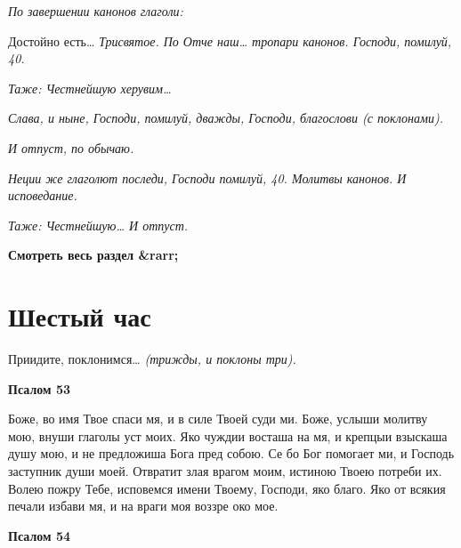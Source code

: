  \itshape По завершении канонов глаголи:\normalfont{}


   Достойно есть… \itshape Трисвятое\normalfont{}. \itshape По\normalfont{} Отче наш… \itshape тропари канонов.\normalfont{} Господи,
помилуй, \itshape 40\normalfont{}.


 \itshape Таже:\normalfont{} Честнейшую херувим…


 \itshape Слава, и ныне,\normalfont{} Господи, помилуй, \itshape дважды\normalfont{}, Господи, благослови \itshape (с
поклонами)\normalfont{}.


 \itshape И отпуст, по обычаю.\normalfont{}


 \itshape Неции же глаголют последи,\normalfont{} Господи помилуй, \itshape 40. Молитвы канонов. И
исповедание.\normalfont{}


 \itshape Таже:\normalfont{} Честнейшую… \itshape И отпуст.\normalfont{}



\mychapterending




\bfseries Смотреть весь раздел &rarr;\normalfont{} 

\section{Шестый час}



Приидите, поклонимся… \itshape (трижды, и поклоны три)\normalfont{}.



 

\bfseries Псалом 53\normalfont{}


   Боже, во имя Твое спаси мя, и в силе Твоей суди ми. Боже, услыши
молитву мою, внуши глаголы уст моих. Яко чуждии восташа на мя, и
крепцыи взыскаша душу мою, и не предложиша Бога пред собою. Се бо Бог
помогает ми, и Господь заступник души моей. Отвратит злая врагом моим,
истиною Твоею потреби их. Волею пожру Тебе, исповемся имени Твоему,
Господи, яко благо. Яко от всякия печали избави мя, и на враги моя воззре
око мое.



 

\bfseries Псалом 54\normalfont{}


